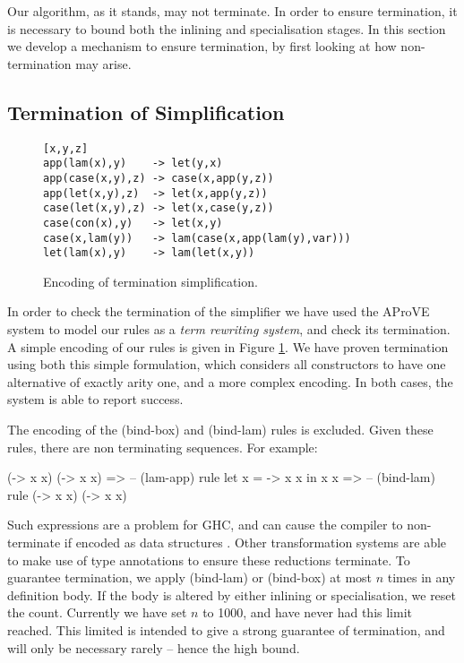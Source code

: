 Our algorithm, as it stands, may not terminate. In order to ensure termination, it is necessary to bound both the inlining and specialisation stages. In this section we develop a mechanism to ensure termination, by first looking at how non-termination may arise.

\subsection{Termination of Simplification}
\label{sec:termination_simplification}

\begin{figure}
\noindent\begin{verbatim}
[x,y,z]
app(lam(x),y)    -> let(y,x)
app(case(x,y),z) -> case(x,app(y,z))
app(let(x,y),z)  -> let(x,app(y,z))
case(let(x,y),z) -> let(x,case(y,z))
case(con(x),y)   -> let(x,y)
case(x,lam(y))   -> lam(case(x,app(lam(y),var)))
let(lam(x),y)    -> lam(let(x,y))
\end{verbatim}
\caption{Encoding of termination simplification.}
\label{fig:term_simplification}
\end{figure}

In order to check the termination of the simplifier we have used the AProVE system \cite{aprove} to model our rules as a \textit{term rewriting system}, and check its termination. A simple encoding of our rules is given in Figure \ref{fig:term_simplification}. We have proven termination using both this simple formulation, which considers all constructors to have one alternative of exactly arity one, and a more complex encoding. In both cases, the system is able to report success.

The encoding of the (bind-box) and (bind-lam) rules is excluded. Given these rules, there are non terminating sequences. For example:

\ignore\begin{code}
(\x -> x x) (\x -> x x)
   => -- (lam-app) rule
let x = \x -> x x in x x
   => -- (bind-lam) rule
(\x -> x x) (\x -> x x)
\end{code}

Such expressions are a problem for GHC, and can cause the compiler to non-terminate if encoded as data structures \cite{spj:inlining}. Other transformation systems \cite{chin:higher_order_removal} are able to make use of type annotations to ensure these reductions terminate. To guarantee termination, we apply (bind-lam) or (bind-box) at most $n$ times in any definition body. If the body is altered by either inlining or specialisation, we reset the count. Currently we have set $n$ to 1000, and have never had this limit reached. This limited is intended to give a strong guarantee of termination, and will only be necessary rarely -- hence the high bound.

